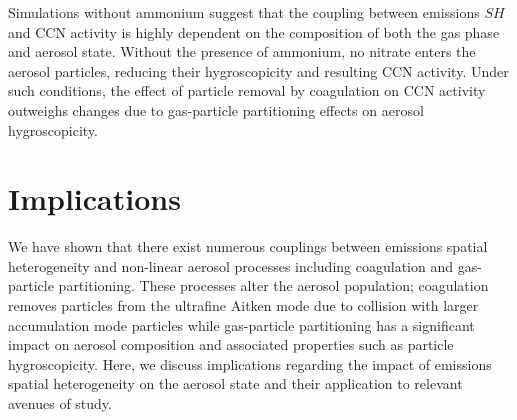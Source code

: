 Simulations without ammonium suggest that the coupling between emissions $SH$ and CCN activity is highly dependent on the composition of both the gas phase and aerosol state. Without the presence of ammonium, no nitrate enters the aerosol particles, reducing their hygroscopicity and resulting CCN activity. Under such conditions, the effect of particle removal by coagulation on CCN activity outweighs changes due to gas-particle partitioning effects on aerosol hygroscopicity. 


\section{Implications}

We have shown that there exist numerous couplings between emissions spatial heterogeneity and non-linear aerosol processes including coagulation and gas-particle partitioning. These processes alter the aerosol population; coagulation removes particles from the ultrafine Aitken mode due to collision with larger accumulation mode particles while gas-particle partitioning has a significant impact on aerosol composition and associated properties such as particle hygroscopicity. Here, we discuss implications regarding the impact of emissions spatial heterogeneity on the aerosol state and their application to relevant avenues of study. 

